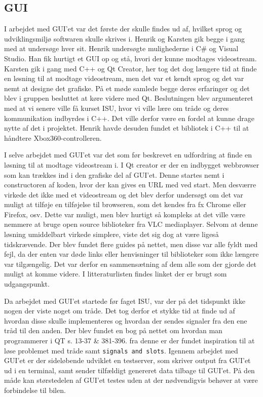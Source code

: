 \subsection{GUI}
\label{sec:gui}

I arbejdet med GUI'et var det første der skulle findes ud af, hvilket sprog og udviklingsmiljø softwaren skulle skrives i. Henrik og Karsten gik begge i gang med at undersøge hver sit. Henrik undersøgte mulighederne i C\# og Visual Studio. Han fik hurtigt et GUI op og stå, hvori der kunne modtages videostream. Karsten gik i gang med C++ og Qt Creator, her tog det dog længere tid at finde en løsning til at modtage videostream, men det var et kendt sprog og det var nemt at designe det grafiske. På et møde samlede begge deres erfaringer og det blev i gruppen besluttet at køre videre med Qt. Beslutningen blev argumenteret med at vi senere ville få kurset ISU\cite{lib:isu}, hvor vi ville lære om tråde og deres kommunikation indbyrdes i C++. Det ville derfor være en fordel at kunne drage nytte af det i projektet. Henrik havde desuden fundet et bibliotek i C++ til at håndtere Xbox360-controlleren.

I selve arbejdet med GUI'et var det som før beskrevet en udfordring at finde en løsning til at modtage videostream i. I Qt creator er der en indbygget webbrowser som kan trækkes ind i den grafiske del af GUI'et. Denne startes nemt i constructoren af koden, hvor der kan gives en URL med ved start. Men desværre virkede det ikke med et videostream og det blev derfor undersøgt om det var muligt at tilføje en tilføjelse til browseren, som det kendes fra fx Chrome eller Firefox, osv. Dette var muligt, men blev hurtigt så kompleks at det ville være nemmere at bruge open source biblioteker fra VLC mediaplayer. Selvom at denne løsning umiddelbart virkede simplere, viste det sig dog at være ligeså tidskrævende. Der blev fundet flere guides på nettet, men disse var alle fyldt med fejl, da der enten var døde links eller henvisninger til biblioteker som ikke længere var tilgængelig. Det var derfor en sammensætning af dem alle som der gjorde det muligt at komme videre. I litteraturlisten findes linket \cite{lib:vlc-using-qt} der er brugt som udgangspunkt. 

Da arbejdet med GUI'et startede før faget ISU, var der på det tidspunkt ikke nogen der viste noget om tråde. Det tog derfor et stykke tid at finde ud af hvordan disse skulle implementeres og hvordan der sendes signaler fra den ene tråd til den anden. Der blev fundet en bog på nettet om hvordan man programmerer i QT \cite{lib:qt-bog} s. 13-37 \& 381-396. fra denne er der fundet inspiration til at løse problemet med tråde samt \texttt{signals and slots}. Igennem arbejdet med GUI'et er der sideløbende udviklet en testserver, som skriver output fra GUI'et ud i en terminal, samt sender tilfældigt genereret data tilbage til GUI'et. På den måde kan størstedelen af GUI'et testes uden at der nødvendigvis behøver at være forbindelse til bilen. 

